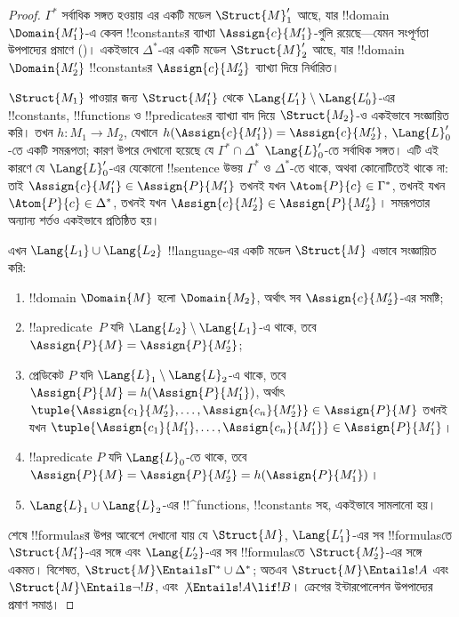 \documentclass[../../../include/open-logic-section]{subfiles}
\begin{document}
\begin{proof}
$\Gamma^*$ সর্বাধিক সঙ্গত হওয়ায় এর একটি মডেল
$\Struct{M}'_1$ আছে, যার !!{domain} $\Domain{M'_1}$-এ কেবল
!!{constant}sর ব্যাখ্যা $\Assign{c}{M'_1}$-গুলি রয়েছে—যেমন
সংপূর্ণতা উপপাদ্যের প্রমাণে ()।
একইভাবে $\Delta^*$-এর একটি মডেল $\Struct{M}'_2$ আছে, যার
!!{domain} $\Domain{M'_2}$ !!{constant}sর
$\Assign{c}{M'_2}$ ব্যাখ্যা দিয়ে নির্ধারিত।

$\Struct{M_1}$ পাওয়ার জন্য $\Struct{M'_1}$ থেকে
$\Lang{L'_1} \setminus \Lang{L'_0}$-এর
!!{constant}s, !!{function}s ও !!{predicate}sর ব্যাখ্যা বাদ দিয়ে
$\Struct{M_2}$-ও একইভাবে সংজ্ঞায়িত করি। তখন
$h \colon M_1 \to M_2$, যেখানে
$h(\Assign{c}{M'_1}) = \Assign{c}{M'_2}$, $\Lang{L}'_0$-তে
একটি সমরূপতা; কারণ উপরে দেখানো হয়েছে যে
$\Gamma^* \cap \Delta^*$ $\Lang{L}'_0$-তে সর্বাধিক সঙ্গত। এটি
এই কারণে যে $\Lang{L}'_0$-এর যেকোনো !!{sentence} উভয়
$\Gamma^*$ ও $\Delta^*$-তে থাকে, অথবা কোনোটিতেই থাকে না: তাই
$\Assign{c}{M'_1} \in \Assign{P}{M'_1}$ তখনই যখন
$\Atom{P}{c} \in \Gamma^*$, তখনই যখন
$\Atom{P}{c} \in \Delta^*$, তখনই যখন
$\Assign{c}{M'_2} \in \Assign{P}{M'_2}$। সমরূপতার অন্যান্য
শর্তও একইভাবে প্রতিষ্ঠিত হয়।

এখন $\Lang{L_1} \cup \Lang{L_2}$ !!{language}-এর একটি মডেল
$\Struct{M}$ এভাবে সংজ্ঞায়িত করি:
\begin{enumerate}
\item !!{domain} $\Domain{M}$ হলো $\Domain{M_2}$, অর্থাৎ সব
  $\Assign{c}{M'_2}$-এর সমষ্টি;
\item !!a{predicate}~$P$ যদি $\Lang{L_2} \setminus
  \Lang{L_1}$-এ থাকে, তবে $\Assign{P}{M} = \Assign{P}{M'_2}$;
\item প্রেডিকেট $P$ যদি $\Lang{L}_1\setminus \Lang{L}_2$-এ থাকে, তবে
  $\Assign{P}{M} = h(\Assign{P}{M'_1})$, অর্থাৎ
  $\tuple{\Assign{c_1}{M'_2}, \dots, \Assign{c_n}{M'_2}} \in
  \Assign{P}{M}$ তখনই যখন $\tuple{\Assign{c_1}{M'_1}, \dots,
  \Assign{c_n}{M'_1}} \in \Assign{P}{M'_1}$।
\item !!a{predicate} $P$ যদি $\Lang{L}_0$-তে থাকে, তবে
  $\Assign{P}{M} = \Assign{P}{M'_2} = h(\Assign{P}{M'_1})$।
\item $\Lang{L}_1 \cup \Lang{L}_2$-এর !!^{function}s, !!{constant}s
  সহ, একইভাবে সামলানো হয়।
\end{enumerate}

শেষে !!{formula}sর উপর আবেশে দেখানো যায় যে
$\Struct{M}$, $\Lang{L'_1}$-এর সব !!{formula}sতে
$\Struct{M'_1}$-এর সঙ্গে এবং $\Lang{L'_2}$-এর সব !!{formula}sতে
$\Struct{M'_2}$-এর সঙ্গে একমত। বিশেষত,
$\Struct{M} \Entails \Gamma^* \cup \Delta^*$; অতএব
$\Struct{M} \Entails !A$ এবং $\Struct{M} \Entails \lnot!B$, এবং
$\not\Entails !A \lif !B$। ক্রেগের ইন্টারপোলেশন উপপাদ্যের প্রমাণ
সমাপ্ত।
\end{proof}
\end{document}
